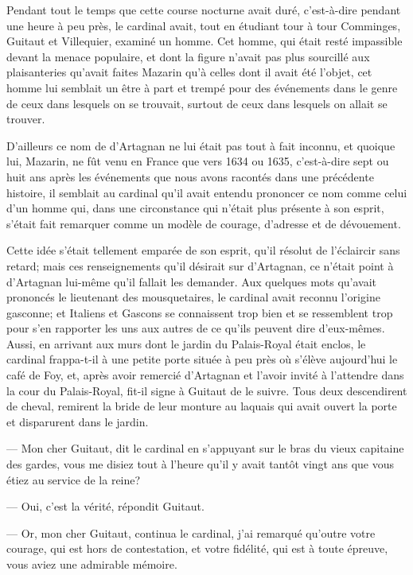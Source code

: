 Pendant tout le temps que cette course nocturne avait duré, c'est-à-dire pendant une heure à peu près, le cardinal avait, tout en étudiant tour à tour Comminges, Guitaut et Villequier, examiné un homme. Cet homme, qui était resté impassible devant la menace populaire, et dont la figure n'avait pas plus sourcillé aux plaisanteries qu'avait faites Mazarin qu'à celles dont il avait été l'objet, cet homme lui semblait un être à part et trempé pour des événements dans le genre de ceux dans lesquels on se trouvait, surtout de ceux dans lesquels on allait se trouver.

D'ailleurs ce nom de d'Artagnan ne lui était pas tout à fait inconnu, et quoique lui, Mazarin, ne fût venu en France que vers 1634 ou 1635, c'est-à-dire sept ou huit ans après les événements que nous avons racontés dans une précédente histoire, il semblait au cardinal qu'il avait entendu prononcer ce nom comme celui d'un homme qui, dans une circonstance qui n'était plus présente à son esprit, s'était fait remarquer comme un modèle de courage, d'adresse et de dévouement.

Cette idée s'était tellement emparée de son esprit, qu'il résolut de l'éclaircir sans retard; mais ces renseignements qu'il désirait sur d'Artagnan, ce n'était point à d'Artagnan lui-même qu'il fallait les demander. Aux quelques mots qu'avait prononcés le lieutenant des mousquetaires, le cardinal avait reconnu l'origine gasconne; et Italiens et Gascons se connaissent trop bien et se ressemblent trop pour s'en rapporter les uns aux autres de ce qu'ils peuvent dire d'eux-mêmes. Aussi, en arrivant aux murs dont le jardin du Palais-Royal était enclos, le cardinal frappa-t-il à une petite porte située à peu près où s'élève aujourd'hui le café de Foy, et, après avoir remercié d'Artagnan et l'avoir invité à l'attendre dans la cour du Palais-Royal, fit-il signe à Guitaut de le suivre. Tous deux descendirent de cheval, remirent la bride de leur monture au laquais qui avait ouvert la porte et disparurent dans le jardin.

— Mon cher Guitaut, dit le cardinal en s'appuyant sur le bras du vieux capitaine des gardes, vous me disiez tout à l'heure qu'il y avait tantôt vingt ans que vous étiez au service de la reine?

— Oui, c'est la vérité, répondit Guitaut.

— Or, mon cher Guitaut, continua le cardinal, j'ai remarqué qu'outre votre courage, qui est hors de contestation, et votre fidélité, qui est à toute épreuve, vous aviez une admirable mémoire.

